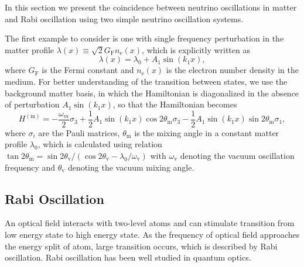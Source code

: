 \documentclass[%
preprint,
 amsmath,amssymb,
 aps,
]{revtex4-1}
\begin{document}


In this section we present the coincidence between neutrino oscillations in matter and Rabi oscillation using two simple neutrino oscillation systems. 

The first example to consider is one with single frequency perturbation in the matter profile $\lambda(x)\equiv\sqrt{2}G_{\mathrm F} n_{\mathrm e}(x)$, which is explicitly written as
\begin{equation}
    \lambda(x) = \lambda_0 + A_1 \sin (k_1 x) ,
\end{equation}
where $G_{\mathrm F}$ is the Fermi constant and $n_{\mathrm e}(x)$ is the electron number density in the medium. For better understanding of the transition between states, we use the background matter basis, in which the Hamiltonian is diagonalized in the absence of perturbation $A_1\sin(k_1 x)$, so that the Hamiltonian becomes
\begin{equation}
    H^{(\mathrm{m})} = -\frac{\omega_m}{2} \sigma_3 + \frac{1}{2} A_1 \sin (k_1 x) \cos 2\theta_{\mathrm m} \sigma_3 -\frac{1}{2} A_1  \sin(k_1 x) \sin 2\theta_{\mathrm m} \sigma_1,\label{neutrino-matter-single-frequency-hamiltonian}
\end{equation}
where $\sigma_i$ are the Pauli matrices, $\theta_{\mathrm m}$ is the mixing angle in a constant matter profile $\lambda_0$, which is calculated using relation $\tan 2\theta_{\mathrm{m}}=\sin 2\theta_{\mathrm v}/\left( \cos 2\theta_{\mathrm v} - \lambda_0/\omega_{\mathrm v} \right)$ with $\omega_{\mathrm v}$ denoting the vacuum oscillation frequency and $\theta_{\mathrm v}$ denoting the vacuum mixing angle.





\subsection{Rabi Oscillation}


An optical field interacts with two-level atoms and can stimulate transition from low energy state to high energy state. As the frequency of optical field approaches the energy split of atom, large transition occurs, which is described by Rabi oscillation. Rabi oscillation has been well studied in quantum optics.\cite{Boyd2008} 
\end{document}
